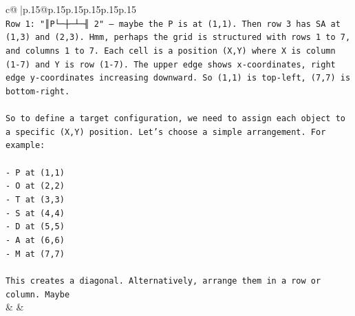 \documentclass{article}
\begin{document}
{\begin{supertabular}{c@{$\;$}|p{.15\linewidth}@{}p{.15\linewidth}p{.15\linewidth}p{.15\linewidth}p{.15\linewidth}p{.15\linewidth}}
{{{\\ 
\texttt{Row 1: "║P└─┼─┴─╢ 2" — maybe the P is at (1,1). Then row 3 has SA at (1,3) and (2,3). Hmm, perhaps the grid is structured with rows 1 to 7, and columns 1 to 7. Each cell is a position (X,Y) where X is column (1{-}7) and Y is row (1{-}7). The upper edge shows x{-}coordinates, right edge y{-}coordinates increasing downward. So (1,1) is top{-}left, (7,7) is bottom{-}right.} \\
\\ 
\texttt{So to define a target configuration, we need to assign each object to a specific (X,Y) position. Let's choose a simple arrangement. For example:} \\
\\ 
\texttt{{-} P at (1,1)} \\
\texttt{{-} O at (2,2)} \\
\texttt{{-} T at (3,3)} \\
\texttt{{-} S at (4,4)} \\
\texttt{{-} D at (5,5)} \\
\texttt{{-} A at (6,6)} \\
\texttt{{-} M at (7,7)} \\
\\ 
\texttt{This creates a diagonal. Alternatively, arrange them in a row or column. Maybe} \\
            }
        }
    }
    & & \\ \\


\end{supertabular}}
\end{document}
